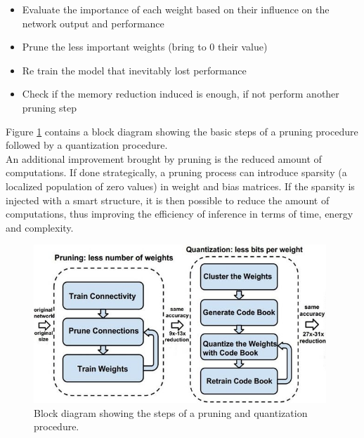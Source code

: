 \documentclass[12pt]{report}
\begin{document}
\begin{itemize}
\item Evaluate the importance of each weight based on their influence on the network output and performance
\item Prune the less important weights (bring to 0 their value)
\item Re train the model that inevitably lost performance
\item Check if the memory reduction induced is enough, if not perform another pruning step
\end{itemize} 

Figure \ref{fig:pruning} contains a block diagram showing the basic steps of a pruning procedure followed by a quantization procedure.\\
An additional improvement brought by pruning is the reduced amount of computations. If done strategically, a pruning process can introduce sparsity (a localized population of zero values) in weight and bias matrices. If the sparsity is injected with a smart structure, it is then possible to reduce the amount of computations, thus improving the efficiency of inference in terms of time, energy and complexity.\\

\begin{figure}[h!]
    \centering
    \includegraphics[width=110mm]{Figures/Chapter1/pruning.jpg} 
    \caption{Block diagram showing the steps of a pruning and quantization procedure.}
    \label{fig:pruning}    
\end{figure}  
\end{document}

